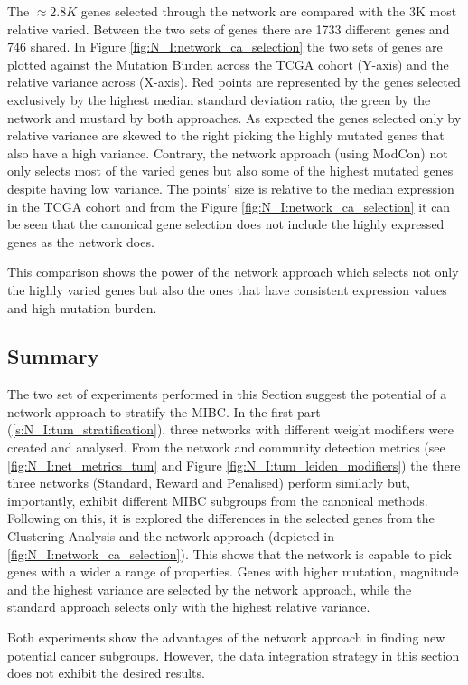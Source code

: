 The $\approx2.8K$ genes selected through the network are compared with the 3K most relative varied. Between the two sets of genes there are 1733 different genes and 746 shared. In Figure \ref{fig:N_I:network_ca_selection} the two sets of genes are plotted against the Mutation Burden across the TCGA cohort (Y-axis) and the relative variance across (X-axis). Red points are represented by the genes selected exclusively by the highest median standard deviation ratio, the green by the network and mustard by both approaches. As expected the genes selected only by relative variance are skewed to the right picking the highly mutated genes that also have a high variance. Contrary, the network approach (using ModCon) not only selects most of the varied genes but also some of the highest mutated genes despite having low variance. The points' size is relative to the median expression in the TCGA cohort and from the Figure \ref{fig:N_I:network_ca_selection} it can be seen that the canonical gene selection does not include the highly expressed genes as the network does.

This comparison shows the power of the network approach which selects not only the highly varied genes but also the ones that have consistent expression values and high mutation burden.

\subsection{Summary}

The two set of experiments performed in this Section suggest the potential of a network approach to stratify the MIBC. In the first part (\cref{s:N_I:tum_stratification}), three networks with different weight modifiers were created and analysed. From the network and community detection metrics (see \cref{fig:N_I:net_metrics_tum} and Figure \cref{fig:N_I:tum_leiden_modifiers}) the there three networks (Standard, Reward and Penalised) perform similarly but, importantly, exhibit different MIBC subgroups from the canonical methods. Following on this, it is explored the differences in the selected genes from the Clustering Analysis and the network approach (depicted in \cref{fig:N_I:network_ca_selection}). This shows that the network is capable to pick genes with a wider a range of properties. Genes with higher mutation, magnitude and the highest variance are selected by the network approach, while the standard approach selects only with the highest relative variance.

Both experiments show the advantages of the network approach in finding new potential cancer subgroups. However, the data integration strategy in this section does not exhibit the desired results.

